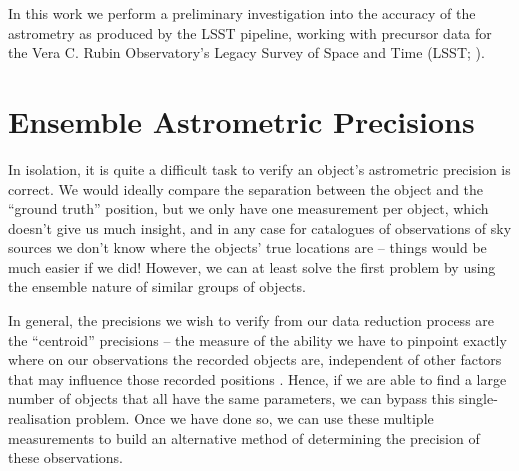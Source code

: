 \documentclass[SE,lsstdraft,authoryear,toc]{lsstdoc}
\begin{document}
In this work we perform a preliminary investigation into the accuracy of the astrometry as produced by the LSST pipeline, working with precursor data for the Vera C. Rubin Observatory's Legacy Survey of Space and Time (LSST; \citealp{Ivezic2019}).

\section{Ensemble Astrometric Precisions}
In isolation, it is quite a difficult task to verify an object's astrometric precision is correct.
We would ideally compare the separation between the object and the ``ground truth'' position, but we only have one measurement per object, which doesn't give us much insight, and in any case for catalogues of observations of sky sources we don't know where the objects' true locations are -- things would be much easier if we did!
However, we can at least solve the first problem by using the ensemble nature of similar groups of objects.

In general, the precisions we wish to verify from our data reduction process are the ``centroid'' precisions -- the measure of the ability we have to pinpoint exactly where on our observations the recorded objects are, independent of other factors that may influence those recorded positions \citep{2017MNRAS.468.2517W,2018MNRAS.481.2148W}.
Hence, if we are able to find a large number of objects that all have the same parameters, we can bypass this single-realisation problem.
Once we have done so, we can use these multiple measurements to build an alternative method of determining the precision of these observations.
\end{document}
